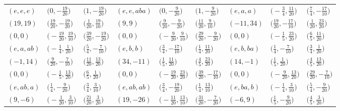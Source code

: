 \documentclass[10pt,a4paper]{amsart}
\theoremstyle{definition}
\numberwithin{equation}{section}
\begin{document}
\begin{landscape}
\begin{table}[th]\centering\small
\begin{tabular}{|lll|lll|lll|}
 \hline
 $(e, e, e)$ & $\bigl(0, -\frac{19}{20}\bigr)$ & $\bigl(1, -\frac{19}{20}\bigr)$ & $(e, e,aba)$ & $\bigl(0, -\frac{9}{20}\bigr)$ & $\bigl(1, -\frac{9}{20}\bigr)$ & $(e, a, a)$ & $\bigl(-\frac{3}{4}, \frac{11}{20}\bigr)$ & $\bigl(\frac{7}{4}, -\frac{17}{10}\bigr)$
 \\
$(19, 19)$ & $\bigl(\frac{19}{20}, -\frac{19}{20}\bigr)$ & $\bigl(\frac{1}{20}, \frac{19}{10}\bigr)$ & $(9, 9)$ & $\bigl(\frac{9}{20}, -\frac{9}{20}\bigr)$ & $\bigl(\frac{11}{20}, \frac{9}{10}\bigr)$ & $(-11, 34)$ & $\bigl(\frac{19}{20}, -\frac{17}{10}\bigr)$ & $\bigl(\frac{1}{20}, \frac{23}{20}\bigr)$
\\
$(0, 0)$ & $\bigl(-\frac{19}{20}, \frac{19}{10}\bigr)$ & $\bigl(\frac{39}{20}, -\frac{19}{20}\bigr)$ & $(0, 0)$ & $\bigl(-\frac{9}{20}, \frac{9}{10}\bigr)$ & $\bigl(\frac{29}{20}, -\frac{9}{20}\bigr)$ & $(0, 0)$ & $\bigl(-\frac{1}{5}, \frac{23}{20}\bigr)$ & $\bigl(\frac{6}{5}, \frac{11}{20}\bigr)$
\\\hline
$(e, a, ab)$ & $\bigl(-\frac{1}{4}, \frac{1}{20}\bigr)$ & $\bigl(\frac{5}{4}, -\frac{7}{10}\bigr)$ & $(e, b, b)$ & $\bigl(\frac{3}{4}, -\frac{17}{10}\bigr)$ & $\bigl(\frac{1}{4}, \frac{11}{20}\bigr)$ & $(e, b, ba)$ & $\bigl(\frac{1}{4}, -\frac{7}{10}\bigr)$ & $\bigl(\frac{3}{4}, \frac{1}{20}\bigr)$
\\
$(-1, 14)$ & $\bigl(\frac{9}{20}, -\frac{7}{10}\bigr)$ & $\bigl(\frac{11}{20}, \frac{13}{20}\bigr)$ & $(34, -11)$ & $\bigl(\frac{1}{5}, \frac{11}{20}\bigr)$ & $\bigl(\frac{4}{5}, \frac{23}{20}\bigr)$ & $(14, -1)$ & $\bigl(\frac{1}{5}, \frac{1}{20}\bigr)$ & $\bigl(\frac{4}{5}, \frac{13}{20}\bigr)$
\\
$(0, 0)$ & $\bigl(-\frac{1}{5}, \frac{13}{20}\bigr)$ & $\bigl(\frac{6}{5}, \frac{1}{20}\bigr)$ & $(0, 0)$ & $\bigl(-\frac{19}{20}, \frac{23}{20}\bigr)$ & $\bigl(\frac{39}{20}, -\frac{17}{10}\bigr)$ & $(0, 0)$ & $\bigl(-\frac{9}{20}, \frac{13}{20}\bigr)$ & $\bigl(\frac{29}{20}, -\frac{7}{10}\bigr)$
\\\hline
$(e, ab, a)$ & $\bigl(\frac{1}{4}, -\frac{9}{20}\bigr)$ & $\bigl(\frac{3}{4}, \frac{3}{10}\bigr)$ & $(e, ab, ab)$ & $\bigl(\frac{3}{4}, -\frac{19}{20}\bigr)$ & $\bigl(\frac{1}{4}, \frac{13}{10}\bigr)$ & $(e, ba, b)$ & $\bigl(-\frac{1}{4}, \frac{3}{10}\bigr)$ & $\bigl(\frac{5}{4}, -\frac{9}{20}\bigr)$
\\
$(9, -6)$ & $\bigl(-\frac{1}{20}, \frac{3}{10}\bigr)$ & $\bigl(\frac{21}{20}, \frac{3}{20}\bigr)$ & $(19, -26)$ & $\bigl(-\frac{11}{20}, \frac{13}{10}\bigr)$ & $\bigl(\frac{31}{20}, -\frac{7}{20}\bigr)$ & $(-6, 9)$ & $\bigl(\frac{1}{5}, -\frac{9}{20}\bigr)$ & $\bigl(\frac{4}{5}, \frac{3}{20}\bigr)$

\end{tabular}
\end{table}
\end{landscape}
\end{document}
